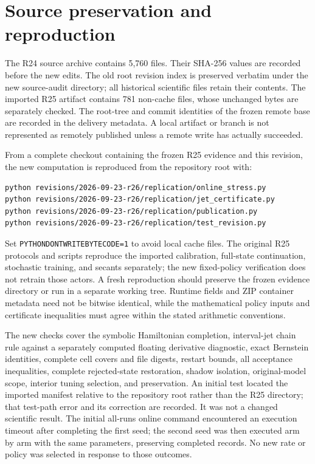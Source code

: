 \section{Source preservation and reproduction}\label{supp:reproduction}
The R24 source archive contains 5,760 files. Their SHA-256 values are recorded before the new edits. The old root revision index is preserved verbatim under the new source-audit directory; all historical scientific files retain their contents. The imported R25 artifact contains 781 non-cache files, whose unchanged bytes are separately checked. The root-tree and commit identities of the frozen remote base are recorded in the delivery metadata. A local artifact or branch is not represented as remotely published unless a remote write has actually succeeded.

From a complete checkout containing the frozen R25 evidence and this revision, the new computation is reproduced from the repository root with:
\begin{verbatim}
python revisions/2026-09-23-r26/replication/online_stress.py
python revisions/2026-09-23-r26/replication/jet_certificate.py
python revisions/2026-09-23-r26/replication/publication.py
python revisions/2026-09-23-r26/replication/test_revision.py
\end{verbatim}
Set \texttt{PYTHONDONTWRITEBYTECODE=1} to avoid local cache files. The original R25 protocols and scripts reproduce the imported calibration, full-state continuation, stochastic training, and secants separately; the new fixed-policy verification does not retrain those actors. A fresh reproduction should preserve the frozen evidence directory or run in a separate working tree. Runtime fields and ZIP container metadata need not be bitwise identical, while the mathematical policy inputs and certificate inequalities must agree within the stated arithmetic conventions.

The new checks cover the symbolic Hamiltonian completion, interval-jet chain rule against a separately computed floating derivative diagnostic, exact Bernstein identities, complete cell covers and file digests, restart bounds, all acceptance inequalities, complete rejected-state restoration, shadow isolation, original-model scope, interior tuning selection, and preservation. An initial test located the imported manifest relative to the repository root rather than the R25 directory; that test-path error and its correction are recorded. It was not a changed scientific result. The initial all-runs online command encountered an execution timeout after completing the first seed; the second seed was then executed arm by arm with the same parameters, preserving completed records. No new rate or policy was selected in response to those outcomes.
